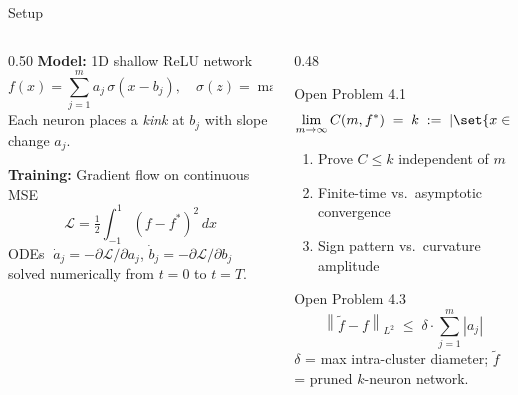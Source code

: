 \documentclass[aspectratio=169, 10pt]{beamer}
\newcommand{\fstar}{f^\ast}
\newcommand{\ftilde}{\tilde{f}}
\newcommand{\norm}[1]{\left\|#1\right\|}
\newcommand{\abs}[1]{\left|#1\right|}
\begin{document}
\begin{frame}{Setup}
  \begin{columns}[T]
    \begin{column}{0.50\textwidth}
      \textbf{Model:} 1D shallow ReLU network
      \[
        f(x) = \sum_{j=1}^{m} a_j\,\sigma(x - b_j),
        \quad \sigma(z)=\max(0,z), \quad x\!\in\![-1,1]
      \]
      Each neuron places a \emph{kink} at $b_j$
      with slope change $a_j$.

      \vspace{0.5em}
      \textbf{Training:} Gradient flow on continuous MSE
      \[
        \mathcal{L}
        = \tfrac{1}{2}\int_{-1}^{1}(f - \fstar)^2\,dx
      \]
      ODEs $\;\dot{a}_j = -\partial\mathcal{L}/\partial a_j$,\;
      $\dot{b}_j = -\partial\mathcal{L}/\partial b_j$\;
      solved numerically from $t = 0$ to $t = T$.
    \end{column}
    \begin{column}{0.48\textwidth}
      \begin{block}{Open Problem 4.1}
        \small
        \[
          \lim_{m\to\infty} C(m,\fstar)
          \;=\; k
          \;:=\;
          \abs{\set{x \in [-1,1] : (\fstar)''(x)=0,\;\uparrow\!\downarrow}}
        \]
        \vspace{-0.3em}
        \begin{enumerate}\small
          \item[\textbf{4.1.1}] Prove $C \leq k$ independent of $m$
          \item[\textbf{4.1.2}] Finite-time vs.\ asymptotic convergence
          \item[\textbf{4.1.3}] Sign pattern vs.\ curvature amplitude
        \end{enumerate}
      \end{block}
      \vspace{0.35em}
      \begin{block}{Open Problem 4.3}
        \small
        \[
          \norm{\ftilde - f}_{L^2}
          \;\leq\; \delta \cdot \sum_{j=1}^{m} \abs{a_j}
        \]
        $\delta$ = max intra-cluster diameter;
        $\ftilde$ = pruned $k$-neuron network.
      \end{block}
    \end{column}
  \end{columns}
\end{frame}
\end{document}
